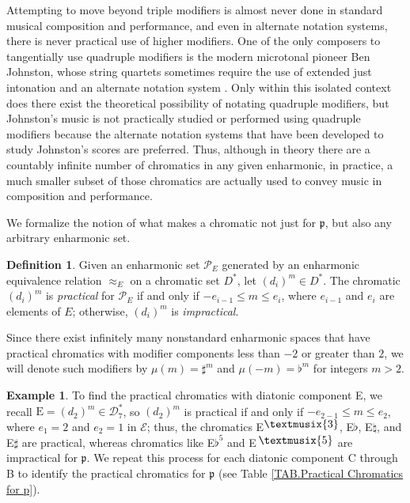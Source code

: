 \documentclass{article}
\theoremstyle{plain}
\theoremstyle{definition}
\newtheorem{definition}[theorem]{Definition}
\newtheorem{example}[theorem]{Example}
\theoremstyle{remark}
\newcommand*\doubleflat{\raisebox{.6ex}{\textmusix{3}}}
\newcommand*\doublesharp{\raisebox{.6ex}{\textmusix{5}}}
\begin{document}
Attempting to move beyond triple modifiers is almost never done in standard musical composition and performance, and even in alternate notation systems, there is never practical use of higher modifiers. One of the only composers to tangentially use quadruple modifiers is the modern microtonal pioneer Ben Johnston, whose string quartets sometimes require the use of extended just intonation and an alternate notation system \cite{johnston_notation_2006}. Only within this isolated context does there exist the theoretical possibility of notating quadruple modifiers, but Johnston's music is not practically studied or performed using quadruple modifiers because the alternate notation systems that have been developed to study Johnston's scores are preferred. Thus, although in theory there are a countably infinite number of chromatics in any given enharmonic, in practice, a much smaller subset of those chromatics are actually used to convey music in composition and performance. 

We formalize the notion of what makes a chromatic  not just for $\mathfrak{p}$, but also any arbitrary enharmonic set.

\begin{definition}
\label{DEF.Practical Chromatic}
	Given an enharmonic set $\mathcal{P}_E$ generated by an enharmonic equivalence relation $\approx_E$ on a chromatic set $D^\ast$, let $(d_i)^m\in D^\ast$. The chromatic $(d_i)^m$ is \textit{practical} for $\mathcal{P}_E$ if and only if $-e_{i-1}\le m\le e_i$, where $e_{i-1}$ and $e_i$ are elements of $E$; otherwise, $(d_i)^m$ is \textit{impractical}.
\end{definition}

Since there exist infinitely many nonstandard enharmonic spaces that have practical chromatics with modifier components less than $-2$ or greater than $2$, we will denote such modifiers by $\mu(m)=\sharp^m$ and $\mu(-m)=\flat^m$ for integers $m>2$.

\begin{example}
	To find the practical chromatics with diatonic component E, we recall $\textrm{E}=(d_2)^m\in\mathcal{D}_7^\ast$, so $(d_2)^m$ is practical if and only if $-e_{2-1}\le m\le e_2$, where $e_1=2$ and $e_2=1$ in $\mathcal{E}$; thus, the chromatics E$\doubleflat$, E$\flat$, E$\natural$, and E$\sharp$ are practical, whereas chromatics like E$\flat^5$ and E$\,\doublesharp$ are impractical for $\mathfrak{p}$. We repeat this process for each diatonic component C through B to identify the practical chromatics for $\mathfrak{p}$ (see Table \ref{TAB.Practical Chromatics for p}).
\end{example}
\end{document}
